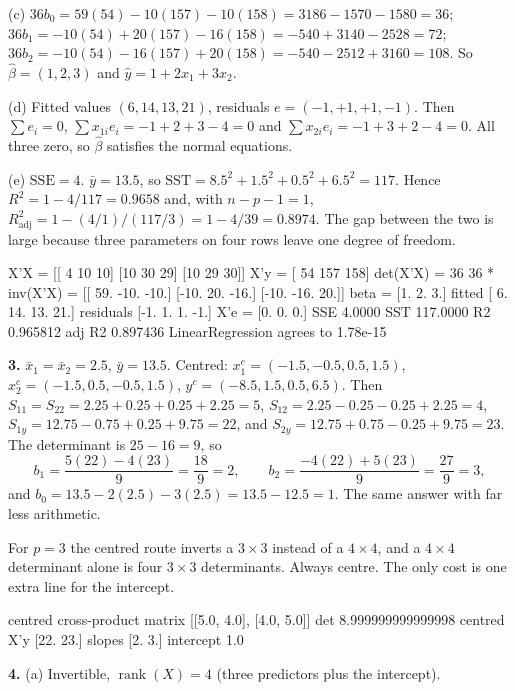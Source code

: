\documentclass[11pt]{article}
\begin{document}
(c) $36b_0 = 59(54) - 10(157) - 10(158) = 3186 - 1570 - 1580 = 36$;
$36b_1 = -10(54) + 20(157) - 16(158) = -540 + 3140 - 2528 = 72$;
$36b_2 = -10(54) - 16(157) + 20(158) = -540 - 2512 + 3160 = 108$. So
$\hat\beta = (1, 2, 3)$ and $\hat y = 1 + 2x_1 + 3x_2$.

(d) Fitted values $(6, 14, 13, 21)$, residuals $e = (-1, +1, +1, -1)$.
Then $\sum e_i = 0$, $\sum x_{1i}e_i = -1+2+3-4 = 0$ and
$\sum x_{2i}e_i = -1+3+2-4 = 0$. All three zero, so $\hat\beta$ satisfies the
normal equations.

(e) $\mathrm{SSE} = 4$. $\bar y = 13.5$, so
$\mathrm{SST} = 8.5^2 + 1.5^2 + 0.5^2 + 6.5^2 = 117$. Hence
$R^2 = 1 - 4/117 = 0.9658$ and, with $n-p-1 = 1$,
$R^2_{\text{adj}} = 1 - (4/1)/(117/3) = 1 - 4/39 = 0.8974$. The gap between
the two is large because three parameters on four rows leave one degree of
freedom.

\begin{codeout}
X'X =
 [[ 4 10 10]
 [10 30 29]
 [10 29 30]]
X'y = [ 54 157 158]      det(X'X) = 36
36 * inv(X'X) =
 [[ 59. -10. -10.]
 [-10.  20. -16.]
 [-10. -16.  20.]]
beta = [1. 2. 3.]      fitted [ 6. 14. 13. 21.]
residuals [-1.  1.  1. -1.]      X'e = [0. 0. 0.]
SSE 4.0000  SST 117.0000  R2 0.965812  adj R2 0.897436
LinearRegression agrees to 1.78e-15
\end{codeout}

\medskip
\textbf{3.} $\bar x_1 = \bar x_2 = 2.5$, $\bar y = 13.5$. Centred:
$x_1^c = (-1.5,-0.5,0.5,1.5)$, $x_2^c = (-1.5,0.5,-0.5,1.5)$,
$y^c = (-8.5,1.5,0.5,6.5)$. Then $S_{11} = S_{22} = 2.25+0.25+0.25+2.25 = 5$,
$S_{12} = 2.25 - 0.25 - 0.25 + 2.25 = 4$,
$S_{1y} = 12.75 - 0.75 + 0.25 + 9.75 = 22$, and
$S_{2y} = 12.75 + 0.75 - 0.25 + 9.75 = 23$. The determinant is
$25 - 16 = 9$, so
\[
  b_1 = \frac{5(22) - 4(23)}{9} = \frac{18}{9} = 2,
  \qquad
  b_2 = \frac{-4(22) + 5(23)}{9} = \frac{27}{9} = 3,
\]
and $b_0 = 13.5 - 2(2.5) - 3(2.5) = 13.5 - 12.5 = 1$. The same answer with
far less arithmetic.

For $p = 3$ the centred route inverts a $3\times3$ instead of a $4\times4$,
and a $4\times4$ determinant alone is four $3\times3$ determinants. Always
centre. The only cost is one extra line for the intercept.

\begin{codeout}
centred cross-product matrix [[5.0, 4.0], [4.0, 5.0]]   det 8.999999999999998
centred X'y [22. 23.]
slopes [2. 3.]   intercept 1.0
\end{codeout}

\medskip
\textbf{4.} (a) Invertible, $\operatorname{rank}(X) = 4$ (three predictors
plus the intercept).
\end{document}
